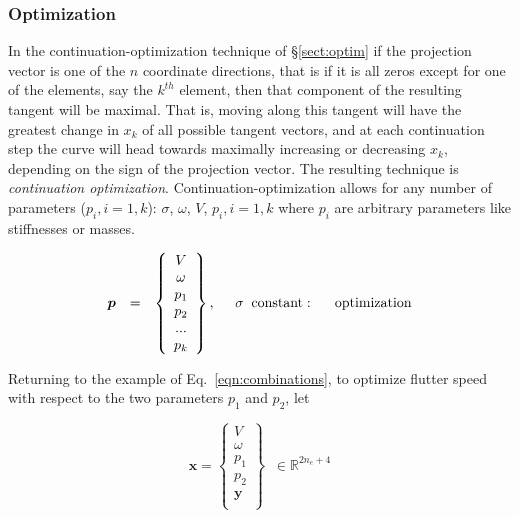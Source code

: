 \documentclass[11pt,openany,twoside]{book}
\numberwithin{equation}{section}		%
\newcommand{\Newterm}[1]{{\em #1}}
\newcommand{\Vector}[1]{\boldsymbol{#1}}
\newcommand{\Sectref}[1]{\S\ref{#1}}
\newcommand{\Eqn}[1]{Eq.\ \ref{#1}}  %
\begin{document}
\subsubsection{Optimization} \label{sect:cont-opt}
In the continuation-optimization technique of \Sectref{sect:optim}
if the projection vector is one of the $n$ coordinate directions,
that is if it is all zeros except for one of the elements,
say the $k^{th}$ element,
then that component of the resulting tangent will be maximal.
That is, moving along this tangent will have the greatest change
in $x_k$ of all possible tangent vectors,
and at each continuation step the curve will head towards maximally
increasing or decreasing $x_k$, depending on the sign of the projection vector.
The resulting technique is \Newterm{continuation optimization}.
Continuation-optimization allows for any number of parameters ($p_i, i=1,k$):
$\sigma$,
$\omega$,
$V$,
$p_i, i=1,k$
where
$p_i$ are arbitrary parameters like stiffnesses or masses.

\begin{equation}
\begin{array}{lclll}
\Vector{p} & = &
	\left\{ \begin{array}{c}
		V \\
		\omega \\
		p_1 \\
		p_2 \\
		... \\
		p_k
	\end{array}\right\}, \;\; & \sigma \;\;\text{constant}: & \hspace{0.1in} \text{optimization} \\[0.3in]
\end{array}
\end{equation}
\par

Returning to the example of \Eqn{eqn:combinations},
to optimize flutter speed with respect to the two parameters
$p_1$ and $p_2$, let

\begin{equation}
\label{eqn:optx}
\Vector{x} = \left\{\begin{array}{c}
V \\
\omega \\
p_1 \\
p_2 \\
\Vector{y} \\
\end{array} \right\} \;\; \in \mathbb{R}^{2n_e+4}
\end{equation}
\end{document}
